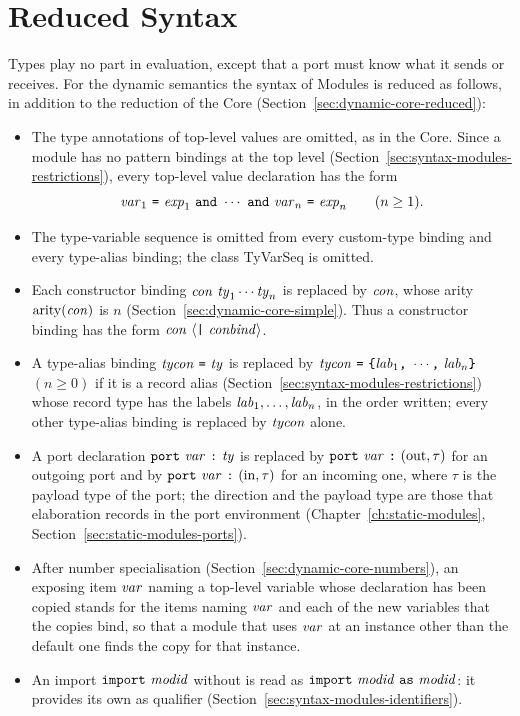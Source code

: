 \section{Reduced Syntax}\label{sec:dynamic-modules-reduced}

Types play no part in evaluation, except that a port must know what it sends
or receives. For the dynamic semantics the syntax of Modules is reduced as
follows, in addition to the reduction of the Core
(Section~\ref{sec:dynamic-core-reduced}):
\begin{itemize}
\item The type annotations of top-level values are omitted, as in the Core.
  Since a module has no pattern bindings at the top level
  (Section~\ref{sec:syntax-modules-restrictions}), every top-level value
  declaration has the form
  \[
    \var_1\ \kw{=}\ \expm_1\ \kw{and}\ \cdots\ \kw{and}\ \var_n\ \kw{=}\
    \expm_n\qquad(n\geq 1).
  \]
\item The type-variable sequence is omitted from every custom-type binding and
  every type-alias binding; the class TyVarSeq is omitted.
\item Each constructor binding $\con\ \ty_1\cdots\ty_n$ is replaced by $\mathit{con}$,
  whose arity $\mathrm{arity}(\mathit{con})$ is $n$ (Section~\ref{sec:dynamic-core-simple}).
  Thus a constructor binding has the form $\con\ \opt{\kw{|}\ \conbind}$.
\item A type-alias binding $\tycon\ \kw{=}\ \ty$ is replaced by
  $\tycon\ \kw{=}\ \kw{\kwlb}\lab_1\kw{,}\ \cdots\kw{,}\ \lab_n\kw{\kwrb}$
  $(n\geq 0)$ if it is a record alias
  (Section~\ref{sec:syntax-modules-restrictions}) whose record type has the
  labels $\mathit{lab}_1,\ldots,\mathit{lab}_n$, in the order written; every other type-alias
  binding is replaced by $\mathit{tycon}$ alone.
\item A port declaration $\kw{port}\ \var\ \kw{:}\ \ty$ is replaced by
  $\kw{port}\ \var\ \kw{:}\ (\smdirout,\tau)$ for an outgoing port and by
  $\textnormal{\texttt{port}}\ \mathit{var}\ \textnormal{\texttt{:}}\ (\mathrm{in},\tau)$ for an incoming one, where
  $\tau$ is the payload type of the port; the direction and the payload type
  are those that elaboration records in the port environment (Chapter~\ref{ch:static-modules},
  Section~\ref{sec:static-modules-ports}).
\item After number specialisation (Section~\ref{sec:dynamic-core-numbers}),
  an exposing item $\mathit{var}$ naming a top-level variable whose declaration has
  been copied stands for the items naming $\mathit{var}$ and each of the new
  variables that the copies bind, so that a module that uses $\mathit{var}$ at an
  instance other than the default one finds the copy for that instance.
\item An import $\textnormal{\texttt{import}}\ \mathit{modid}$ without \kw{as} is read as
  $\kw{import}\ \modid\ \kw{as}\ \modid$: it provides its own \modid{} as
  qualifier (Section~\ref{sec:syntax-modules-identifiers}).
\end{itemize}
